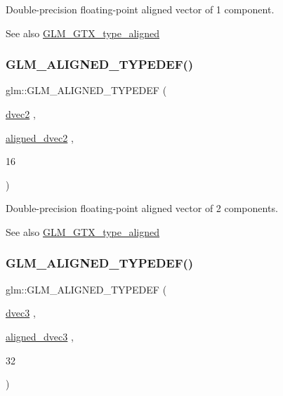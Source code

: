 Double-\/precision floating-\/point aligned vector of 1 component. \begin{DoxySeeAlso}{See also}
\mbox{\hyperlink{group__gtx__type__aligned}{G\+L\+M\+\_\+\+G\+T\+X\+\_\+type\+\_\+aligned}} 
\end{DoxySeeAlso}
\mbox{\label{group__gtx__type__aligned_ga78bfec2f185d1d365ea0a9ef1e3d45b8}} 
\subsubsection{\texorpdfstring{GLM\_ALIGNED\_TYPEDEF()}{GLM\_ALIGNED\_TYPEDEF()}\hspace{0.1cm}{\footnotesize\ttfamily [156/209]}}
{\footnotesize\ttfamily glm\+::\+G\+L\+M\+\_\+\+A\+L\+I\+G\+N\+E\+D\+\_\+\+T\+Y\+P\+E\+D\+EF (\begin{DoxyParamCaption}\item[{\mbox{\hyperlink{group__core__types_gae6727259898288cae197724d5f172b3b}{dvec2}}}]{,  }\item[{\mbox{\hyperlink{group__gtc__type__aligned_ga1e6972e837bc34b3424af8d63a71d7c6}{aligned\+\_\+dvec2}}}]{,  }\item[{16}]{ }\end{DoxyParamCaption})}

Double-\/precision floating-\/point aligned vector of 2 components. \begin{DoxySeeAlso}{See also}
\mbox{\hyperlink{group__gtx__type__aligned}{G\+L\+M\+\_\+\+G\+T\+X\+\_\+type\+\_\+aligned}} 
\end{DoxySeeAlso}
\mbox{\label{group__gtx__type__aligned_ga01fe6fee6db5df580b6724a7e681f069}} 
\subsubsection{\texorpdfstring{GLM\_ALIGNED\_TYPEDEF()}{GLM\_ALIGNED\_TYPEDEF()}\hspace{0.1cm}{\footnotesize\ttfamily [157/209]}}
{\footnotesize\ttfamily glm\+::\+G\+L\+M\+\_\+\+A\+L\+I\+G\+N\+E\+D\+\_\+\+T\+Y\+P\+E\+D\+EF (\begin{DoxyParamCaption}\item[{\mbox{\hyperlink{group__core__types_ga7f3287f952e6ccb481231368091702ac}{dvec3}}}]{,  }\item[{\mbox{\hyperlink{group__gtc__type__aligned_ga82da11893fbac3bda647c9de9da62693}{aligned\+\_\+dvec3}}}]{,  }\item[{32}]{ }\end{DoxyParamCaption})}

